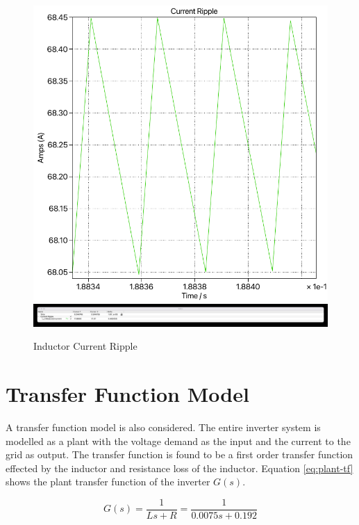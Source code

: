 \documentclass[12pt]{article}
\begin{document}
\begin{figure}[ht]
    \centering{}
    \includegraphics[width=\textwidth, height=0.4\textheight, keepaspectratio]{img/Switching Current Ripple.pdf}
    \includegraphics[width=\textwidth, height=0.4\textheight, keepaspectratio]{img/Switching Current Ripple Cursor.jpg}
    \caption{Inductor Current Ripple}
    \label{fig:switching-current-ripple}
\end{figure}

\section{Transfer Function Model}
\label{sec:tf-model}

A transfer function model is also considered.
The entire inverter system is modelled as a plant with the voltage demand as the input and the current to the grid as output.
The transfer function is found to be a first order transfer function effected by the inductor and resistance loss of the inductor.
Equation \ref{eq:plant-tf} shows the plant transfer function of the inverter $G(s)$.

\begin{equation} \label{eq:plant-tf}
    G(s) = \frac{1}{Ls + R} = \frac{1}{0.0075 s + 0.192}
\end{equation}
\end{document}
